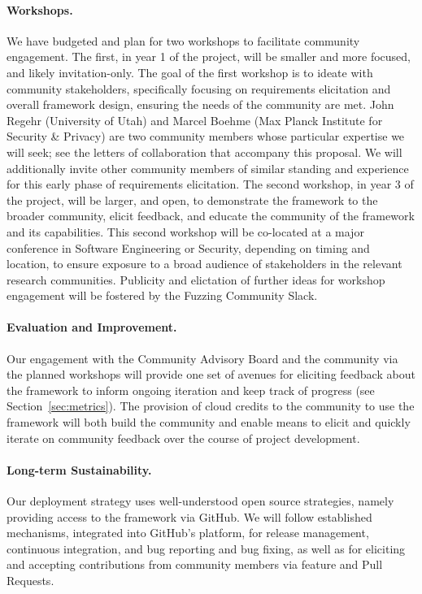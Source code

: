 \paragraph{Workshops.}  We have budgeted and plan for two workshops to
facilitate community engagement.  The first, in year 1 of the project, will be
smaller and more focused, and likely invitation-only. The goal of the first workshop is
to ideate with community stakeholders, specifically focusing on requirements
elicitation and overall framework design, ensuring the needs of the community
are met.  John Regehr (University of Utah) and Marcel Boehme (Max Planck
Institute for Security \& Privacy) are two community members whose particular
expertise we will seek; see the letters of collaboration that accompany this
proposal.  We will additionally invite other community members of similar
standing and experience for this early phase of requirements elicitation.   The
second workshop, in year 3 of the project, will be larger, and open, to demonstrate the
framework to the broader community, elicit feedback, and educate the community
of the framework and its capabilities.  This second workshop will be co-located
at a major conference in Software Engineering or Security, depending on timing
and location, to ensure exposure to a broad audience of stakeholders in the
relevant research communities.   Publicity and elictation of further
ideas for workshop engagement will be fostered by the Fuzzing
Community Slack.

\paragraph{Evaluation and Improvement.} Our engagement with the Community
Advisory Board and the community via the planned workshops will provide one set
of avenues for eliciting feedback about the framework to inform ongoing
iteration and keep track of progress (see Section~\ref{sec:metrics}).  
The provision of cloud credits to the community
to use the framework will both build the community and enable means to elicit
and quickly iterate on community feedback over the course of project
development. 

\paragraph{Long-term Sustainability.} Our deployment strategy uses
well-understood open source strategies, namely providing access to the framework
via GitHub.  We will follow established mechanisms, integrated into GitHub's
platform, for release management, continuous integration, and bug reporting and
bug fixing, as well as for eliciting and accepting contributions from community
members via feature and Pull Requests. 

